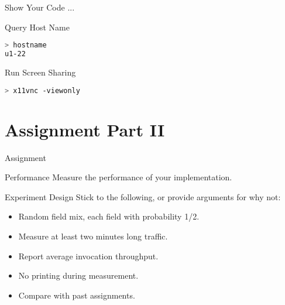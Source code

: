 \begin{frame}[fragile]{Show Your Code ...}
    \begin{block}{Query Host Name}
\begin{lstlisting}[language=bash,style=mini]
> hostname
u1-22
\end{lstlisting}
    \end{block}
    \begin{block}{Run Screen Sharing}
\begin{lstlisting}[language=bash,style=mini]
> x11vnc -viewonly
\end{lstlisting}
    \end{block}
\end{frame}


\section{Assignment Part II}


\begin{frame}{Assignment}
    \begin{block}{Performance}
        Measure the performance of your implementation.
    \end{block}

    \bigskip

    \begin{block}{Experiment Design}
        Stick to the following, or provide arguments for why not:
        \begin{itemize}
            \item Random field mix, each field with probability 1/2.
            \item Measure at least two minutes long traffic.
            \item Report average invocation throughput.
            \item No printing during measurement.
            \item Compare with past assignments.
        \end{itemize}
    \end{block}
\end{frame}


